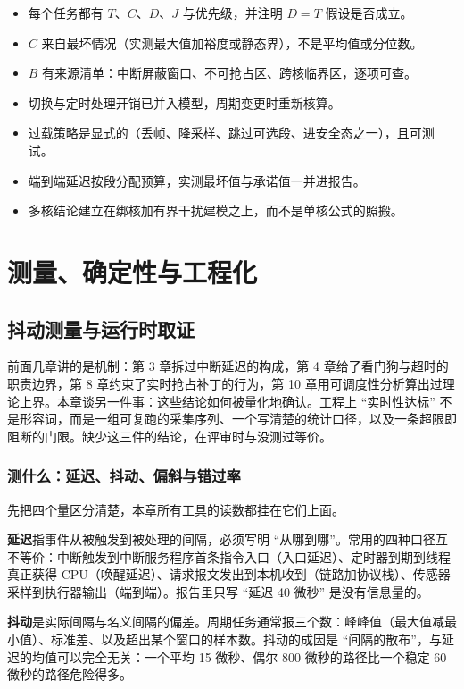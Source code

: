 \documentclass[12pt,a4paper,fontset=fandol]{ctexbook}
\begin{document}
\begin{itemize}
\item 每个任务都有 $T$、$C$、$D$、$J$ 与优先级，并注明 $D = T$ 假设是否成立。
\item $C$ 来自最坏情况（实测最大值加裕度或静态界），不是平均值或分位数。
\item $B$ 有来源清单：中断屏蔽窗口、不可抢占区、跨核临界区，逐项可查。
\item 切换与定时处理开销已并入模型，周期变更时重新核算。
\item 过载策略是显式的（丢帧、降采样、跳过可选段、进安全态之一），且可测试。
\item 端到端延迟按段分配预算，实测最坏值与承诺值一并进报告。
\item 多核结论建立在绑核加有界干扰建模之上，而不是单核公式的照搬。
\end{itemize}

\part{测量、确定性与工程化}

\chapter{抖动测量与运行时取证}
\label{ch:ch11-tracing}

前面几章讲的是机制：第 3 章拆过中断延迟的构成，第 4 章给了看门狗与超时的职责边界，第 8 章约束了实时抢占补丁的行为，第 10 章用可调度性分析算出过理论上界。本章谈另一件事：这些结论如何被量化地确认。工程上 ``实时性达标'' 不是形容词，而是一组可复跑的采集序列、一个写清楚的统计口径，以及一条超限即阻断的门限。缺少这三件的结论，在评审时与没测过等价。

\section{测什么：延迟、抖动、偏斜与错过率}

先把四个量区分清楚，本章所有工具的读数都挂在它们上面。

\textbf{延迟}指事件从被触发到被处理的间隔，必须写明 ``从哪到哪''。常用的四种口径互不等价：中断触发到中断服务程序首条指令入口（入口延迟）、定时器到期到线程真正获得 CPU（唤醒延迟）、请求报文发出到本机收到（链路加协议栈）、传感器采样到执行器输出（端到端）。报告里只写 ``延迟 40 微秒'' 是没有信息量的。

\textbf{抖动}是实际间隔与名义间隔的偏差。周期任务通常报三个数：峰峰值（最大值减最小值）、标准差、以及超出某个窗口的样本数。抖动的成因是 ``间隔的散布''，与延迟的均值可以完全无关：一个平均 15 微秒、偶尔 800 微秒的路径比一个稳定 60 微秒的路径危险得多。
\end{document}

